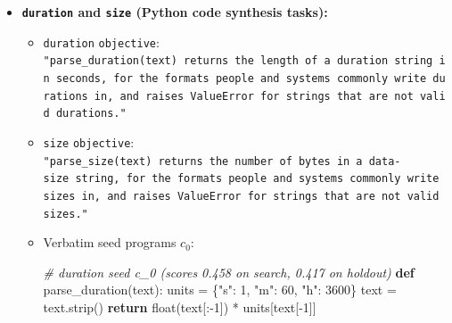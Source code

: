 \documentclass[10pt]{article}
\newenvironment{Shaded}{}{}
\newcommand{\BuiltInTok}[1]{\textcolor[rgb]{0.00,0.50,0.00}{#1}}
\newcommand{\CommentTok}[1]{\textcolor[rgb]{0.38,0.63,0.69}{\textit{#1}}}
\newcommand{\ControlFlowTok}[1]{\textcolor[rgb]{0.00,0.44,0.13}{\textbf{#1}}}
\newcommand{\DecValTok}[1]{\textcolor[rgb]{0.25,0.63,0.44}{#1}}
\newcommand{\KeywordTok}[1]{\textcolor[rgb]{0.00,0.44,0.13}{\textbf{#1}}}
\newcommand{\NormalTok}[1]{#1}
\newcommand{\OperatorTok}[1]{\textcolor[rgb]{0.40,0.40,0.40}{#1}}
\newcommand{\StringTok}[1]{\textcolor[rgb]{0.25,0.44,0.63}{#1}}
\begin{document}
\begin{itemize}
\begin{itemize}
\begin{Shaded}
\begin{Highlighting}[]
\NormalTok{The following translations from German to English contain a particular error.}
\NormalTok{That error will be one of the following types: Named Entities: An entity (names,}
\NormalTok{places, locations, etc.) is changed to a different entity. Numerical Values:}
\NormalTok{Numerical values (ordinals or cardinals), dates, and/or units are changed.}
\NormalTok{Modifiers or Adjectives: The modifiers and adjectives pertaining to a noun are}
\NormalTok{changed. Negation or Antonyms: Introduce or remove a negation or change}
\NormalTok{comparatives to their antonyms. Facts: Trivial factual errors not pertaining to}
\NormalTok{the above classes are introduced in the translations. Dropped Content: A}
\NormalTok{significant clause in the translation is removed. Please identify that error.}
\NormalTok{Options:}
\NormalTok{(A) Modifiers or Adjectives}
\NormalTok{(B) Numerical Values}
\NormalTok{(C) Negation or Antonyms}
\NormalTok{(D) Named Entities}
\NormalTok{(E) Dropped Content}
\NormalTok{(F) Facts}
\end{Highlighting}
\end{Shaded}
  \end{itemize}
\item
  \textbf{\texttt{duration} and \texttt{size} (Python code synthesis
  tasks):}

  \begin{itemize}
  \item
    \texttt{duration} \texttt{objective}:
    \texttt{"parse\_duration(text)\ returns\ the\ length\ of\ a\ duration\ string\ in\ seconds,\ for\ the\ formats\ people\ and\ systems\ commonly\ write\ durations\ in,\ and\ raises\ ValueError\ for\ strings\ that\ are\ not\ valid\ durations."}
  \item
    \texttt{size} \texttt{objective}:
    \texttt{"parse\_size(text)\ returns\ the\ number\ of\ bytes\ in\ a\ data-size\ string,\ for\ the\ formats\ people\ and\ systems\ commonly\ write\ sizes\ in,\ and\ raises\ ValueError\ for\ strings\ that\ are\ not\ valid\ sizes."}
  \item
    Verbatim seed programs \(c_0\):

\begin{Shaded}
\begin{Highlighting}[]
\CommentTok{\# duration seed c\_0 (scores 0.458 on search, 0.417 on holdout)}
\KeywordTok{def}\NormalTok{ parse\_duration(text):}
\NormalTok{    units }\OperatorTok{=}\NormalTok{ \{}\StringTok{"s"}\NormalTok{: }\DecValTok{1}\NormalTok{, }\StringTok{"m"}\NormalTok{: }\DecValTok{60}\NormalTok{, }\StringTok{"h"}\NormalTok{: }\DecValTok{3600}\NormalTok{\}}
\NormalTok{    text }\OperatorTok{=}\NormalTok{ text.strip()}
    \ControlFlowTok{return} \BuiltInTok{float}\NormalTok{(text[:}\OperatorTok{{-}}\DecValTok{1}\NormalTok{]) }\OperatorTok{*}\NormalTok{ units[text[}\OperatorTok{{-}}\DecValTok{1}\NormalTok{]]}


\end{Highlighting}
\end{Shaded}
\end{itemize}
\end{itemize}
\end{document}
